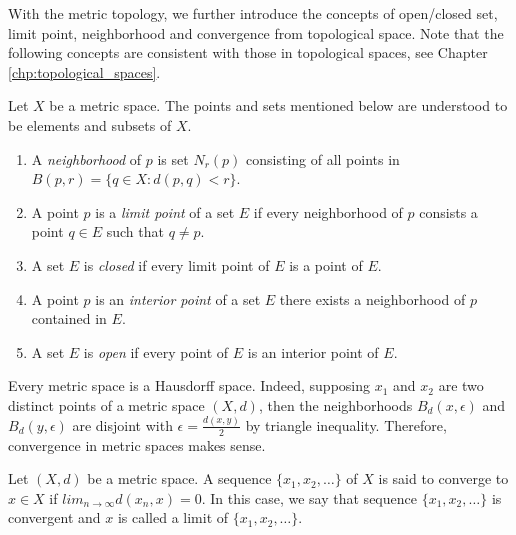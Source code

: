 With the metric topology, we further introduce the concepts of open/closed 
set, limit point, neighborhood and convergence from topological space. 
Note that the following concepts are consistent with those in topological 
spaces, see Chapter \ref{chp:topological_spaces}. 
\begin{defn}
Let $X$ be a metric space. The points and sets mentioned below 
are understood to be elements and subsets of $X$.
\begin{enumerate}
\item A \emph{neighborhood} of $p$ is set $N_r(p)$ consisting of all points 
in $B(p, r) = \{q \in X : d(p, q) < r\}$.
\item A point $p$ is a \emph{limit point} of a set $E$ if every neighborhood 
of $p$ 
consists a point $q \in E$ such that $q \neq p$.
\item A set $E$ is \emph{closed} if every limit point of $E$ is a point 
of $E$.
\item A point $p$ is an \emph{interior point} of a set $E$ there exists a 
neighborhood of $p$ contained in $E$.
\item A set $E$ is \emph{open} if every point of $E$ is an interior point 
of $E$.
\end{enumerate}
\end{defn}

Every metric space is a Hausdorff space. 
Indeed, supposing $x_1$ and $x_2$ are two distinct points of a metric space 
$(X, d)$, then the neighborhoods $B_d(x, \epsilon)$ and $B_d(y, \epsilon)$ 
are disjoint with $\epsilon = \frac{d(x, y)}{2}$ by triangle inequality. 
Therefore, convergence in metric spaces makes sense.
\begin{defn}
Let $(X, d)$ be a metric space. A sequence $\{x_1, x_2, \ldots\}$ of $X$ is said 
to converge to $x \in X$ if $lim_{n \to \infty} d(x_n, x) = 0$. 
In this case, we say that sequence $\{x_1, x_2, \ldots\}$ is convergent 
and $x$ is called a limit of $\{x_1, x_2, \ldots\}$. 
\end{defn}

